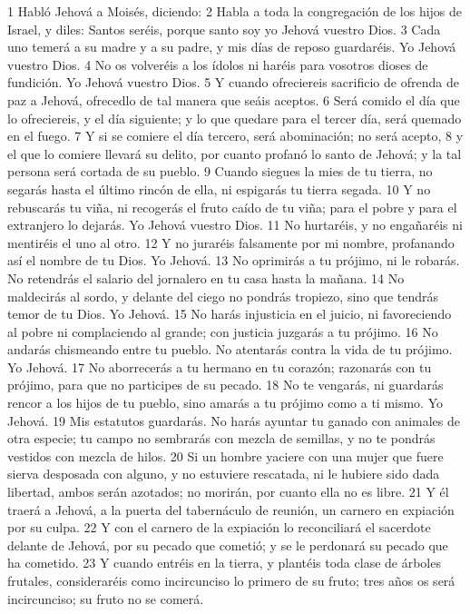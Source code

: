1 Habló Jehová a Moisés, diciendo:
2 Habla a toda la congregación de los hijos de Israel, y diles: Santos seréis, porque santo soy yo Jehová vuestro Dios.
3 Cada uno temerá a su madre y a su padre, y mis días de reposo guardaréis. Yo Jehová vuestro Dios.
4 No os volveréis a los ídolos ni haréis para vosotros dioses de fundición. Yo Jehová vuestro Dios.
5 Y cuando ofreciereis sacrificio de ofrenda de paz a Jehová, ofrecedlo de tal manera que seáis aceptos.
6 Será comido el día que lo ofreciereis, y el día siguiente; y lo que quedare para el tercer día, será quemado en el fuego.
7 Y si se comiere el día tercero, será abominación; no será acepto,
8 y el que lo comiere llevará su delito, por cuanto profanó lo santo de Jehová; y la tal persona será cortada de su pueblo.
9 Cuando siegues la mies de tu tierra, no segarás hasta el último rincón de ella, ni espigarás tu tierra segada.
10 Y no rebuscarás tu viña, ni recogerás el fruto caído de tu viña; para el pobre y para el extranjero lo dejarás. Yo Jehová vuestro Dios.
11 No hurtaréis, y no engañaréis ni mentiréis el uno al otro.
12 Y no juraréis falsamente por mi nombre, profanando así el nombre de tu Dios. Yo Jehová.
13 No oprimirás a tu prójimo, ni le robarás. No retendrás el salario del jornalero en tu casa hasta la mañana.
14 No maldecirás al sordo, y delante del ciego no pondrás tropiezo, sino que tendrás temor de tu Dios. Yo Jehová.
15 No harás injusticia en el juicio, ni favoreciendo al pobre ni complaciendo al grande; con justicia juzgarás a tu prójimo.
16 No andarás chismeando entre tu pueblo. No atentarás contra la vida de tu prójimo. Yo Jehová.
17 No aborrecerás a tu hermano en tu corazón; razonarás con tu prójimo, para que no participes de su pecado.
18 No te vengarás, ni guardarás rencor a los hijos de tu pueblo, sino amarás a tu prójimo como a ti mismo. Yo Jehová.
19 Mis estatutos guardarás. No harás ayuntar tu ganado con animales de otra especie; tu campo no sembrarás con mezcla de semillas, y no te pondrás vestidos con mezcla de hilos.
20 Si un hombre yaciere con una mujer que fuere sierva desposada con alguno, y no estuviere rescatada, ni le hubiere sido dada libertad, ambos serán azotados; no morirán, por cuanto ella no es libre.
21 Y él traerá a Jehová, a la puerta del tabernáculo de reunión, un carnero en expiación por su culpa.
22 Y con el carnero de la expiación lo reconciliará el sacerdote delante de Jehová, por su pecado que cometió; y se le perdonará su pecado que ha cometido.
23 Y cuando entréis en la tierra, y plantéis toda clase de árboles frutales, consideraréis como incircunciso lo primero de su fruto; tres años os será incircunciso; su fruto no se comerá.
